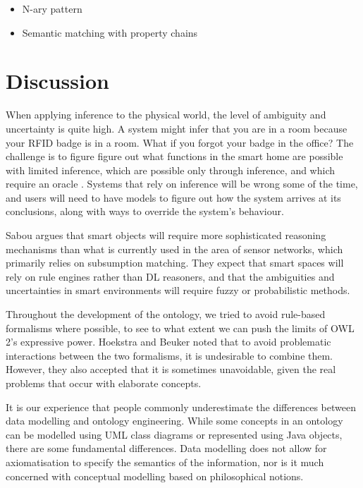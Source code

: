 \begin{itemize}
	\item N-ary pattern 
	\item Semantic matching with property chains
\end{itemize}


\section{Discussion}

When applying inference to the physical world, the level of ambiguity and uncertainty is quite high. A system might infer that you are in a room because your RFID badge is in a room. What if you forgot your badge in the office? The challenge is to figure figure out what functions in the smart home are possible with limited inference, which are possible only through inference, and which require an oracle \cite{Edwards2001}. Systems that rely on inference will be wrong some of the time, and users will need to have models to figure out how the system arrives at its conclusions, along with ways to override the system's behaviour.

Sabou \cite{Sabou2010} argues that smart objects will require more sophisticated reasoning mechanisms than what is currently used in the area of sensor networks, which primarily relies on subsumption matching. They expect that smart spaces will rely on rule engines rather than DL reasoners, and that the ambiguities and uncertainties in smart environments will require fuzzy or probabilistic methods.

Throughout the development of the ontology, we tried to avoid rule-based formalisms where possible, to see to what extent we can push the limits of OWL 2's expressive power. Hoekstra and Beuker \cite{Hoekstra2008} noted that to avoid problematic interactions between the two formalisms, it is undesirable to combine them. However, they also accepted that it is sometimes unavoidable, given the real problems that occur with elaborate concepts. 

It is our experience that people commonly underestimate the differences between data modelling and ontology engineering. While some concepts in an ontology can be modelled using UML class diagrams or represented using Java objects, there are some fundamental differences. Data modelling does not allow for axiomatisation to specify the semantics of the information, nor is it much concerned with conceptual modelling based on philosophical notions. 

